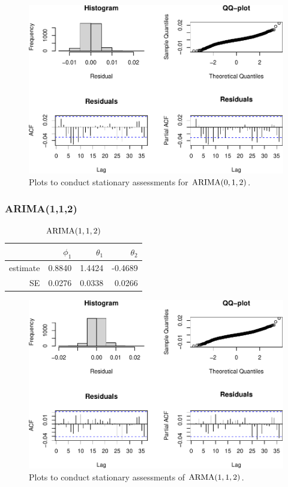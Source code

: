 \documentclass[final,
  11pt,
]{article}
\begin{document}
\begin{figure}
    \includegraphics{paper_files/figure-latex/unnamed-chunk-11-1.pdf}
    \caption{Plots to conduct stationary assessments for $\operatorname{ARIMA}(0,1,2)$.}
    \label{fig:res3}
\end{figure}

\hypertarget{arima112}{%
\subsubsection{ARIMA(1,1,2)}\label{arima112}}

\begin{table}
    \centering
    \caption{$\operatorname{ARIMA}(1,1,2)$}
    \begin{tabular}[t]{r r r r}
        \hline
        &$\phi_1$ &$\theta_1$ & $\theta_2$\\
        \hline
        estimate&    0.8840 & 1.4424 & -0.4689\\
        SE		&	 0.0276 & 0.0338 & 0.0266\\
        \hline
    \end{tabular}
    \label{tbl:arima112}
\end{table}%

\begin{figure}
    \includegraphics{paper_files/figure-latex/unnamed-chunk-13-1.pdf}
    \caption{Plots to conduct stationary assessments of $\operatorname{ARMA}(1,1,2)$.}
    \label{fig:res1}
\end{figure}
\end{document}
